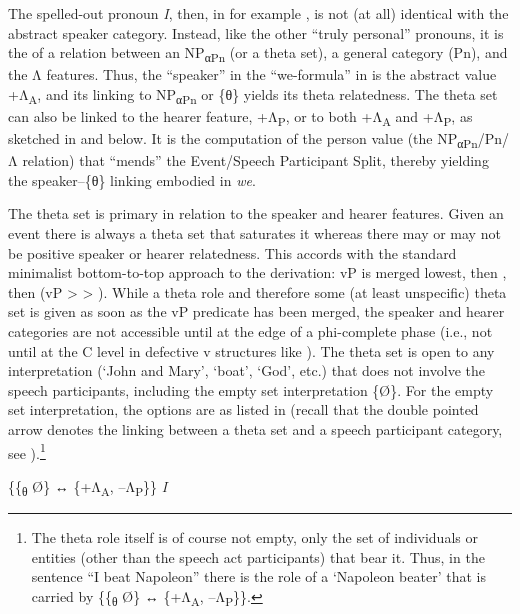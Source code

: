\documentclass[output=paper]{LSP/langsci}
\begin{document}
The spelled-out pronoun \textit{I}, then, in for example , is not (at all) identical with the abstract speaker category. Instead, like the other “truly personal” pronouns, it is the  of a relation between an NP\textsubscript{α}\textsubscript{Pn} (or a theta set), a general  category (Pn), and the Λ features. Thus, the “speaker” in the “we-formula” in  is the abstract value +Λ\textsubscript{A}, and its linking to NP\textsubscript{α}\textsubscript{Pn} or \{θ\} yields its theta relatedness. The theta set can also be linked to the hearer feature, +Λ\textsubscript{P}, or to both +Λ\textsubscript{A} and +Λ\textsubscript{P}, as sketched in  and  below. It is the computation of the person value (the NP\textsubscript{α}\textsubscript{Pn}/Pn/Λ relation) that “mends” the Event/Speech Participant Split, thereby yielding the speaker–\{θ\} linking embodied in \textit{we}.

The theta set is primary in relation to the speaker and hearer features. Given an event there is always a theta set that saturates it whereas there may or may not be positive speaker or hearer relatedness. This accords with the standard minimalist bottom-to-top approach to the derivation: vP is merged lowest, then , then  (vP {\textgreater}  {\textgreater} ). While a theta role and therefore some (at least unspecific) theta set is given as soon as the vP predicate has been merged, the speaker and hearer categories are not accessible until at the edge of a phi-complete phase (i.e., not until at the C level in defective v structures like ). The theta set is open to any interpretation (‘John and Mary’, ‘boat’, ‘God’, etc.) that does not involve the speech participants, including the empty set interpretation \{Ø\}. For the empty set interpretation, the options are as listed in  (recall that the double pointed arrow denotes the linking between a theta set and a speech participant category, see ).\footnote{The theta role itself is of course not empty, only the set of individuals or entities (other than the speech act participants) that bear it. Thus, in the sentence “I beat Napoleon” there is the role of a ‘Napoleon beater’ that is carried by \{\{\textsubscript{θ} Ø\} ↔ \{+Λ\textsubscript{A}, –Λ\textsubscript{P}\}\}.}

\ea%
    \label{ex:Sigurdsson:30}
\ea  \{\{\textsubscript{θ} Ø\} ↔ \{+Λ\textsubscript{A}, –Λ\textsubscript{P}\}\} \hspace{2em} \textit{I}
\end{document}
